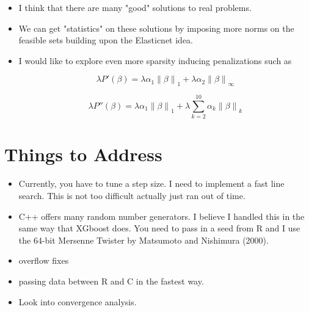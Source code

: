 \documentclass[10pt, reqno]{article}
\numberwithin{equation}{section}
\newcommand{\norm}[1]{\left\lVert#1\right\rVert}
\begin{document}
\begin{itemize}
\item I think that there are many "good" solutions to real problems.

\item We can get "statistics" on these solutions by imposing more norms on the feasible sets building upon the Elasticnet \cite{elasticnet} idea.

\item I would like to explore even more sparsity inducing penalizations such as

\[
\lambda P'(\beta) = \lambda \alpha_1 \norm{\beta}_1 + \lambda \alpha_2 \norm{\beta}_\infty 
\]

\[
\lambda P''(\beta) = \lambda \alpha_1 \norm{\beta}_1 + \lambda \sum_{k = 2}^{10} \alpha_k \norm{\beta}_{k}
\]

\end{itemize}

\newpage
\section*{Things to Address}

\begin{itemize}

\item Currently, you have to tune a step size. I need to implement a fast line search. This is not too difficult actually just ran out of time.

\item C++ offers many random number generators.
I believe I handled this in the same way that XGboost does.
You need to pass in a seed from R and I use the 64-bit Mersenne Twister by Matsumoto and Nishimura (2000).

\item overflow fixes

\item passing data between R and C in the fastest way.

\item Look into convergence analysis.

\end{itemize}
\end{document}
